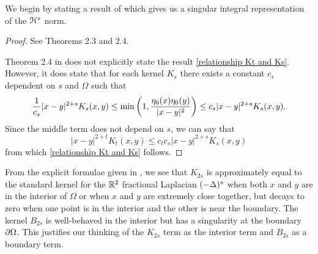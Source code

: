 We begin by stating a result of \cite{CaSt} which gives us a singular integral representation of the $\mathcal{H}^s$ norm.  

\begin{proof}
See \cite{CaSt} Theorems 2.3 and 2.4.  

Theorem 2.4 in \cite{CaSt} does not explicitly state the result \eqref{relationship Kt and Ks}.  However, it does state that for each kernel $K_s$ there exists a constant $c_s$ dependent on $s$ and $\Omega$ such that 
\[ \frac{1}{c_s} |x-y|^{2+s} K_s(x,y) \leq \min\left( 1,\frac{\eta_{0}(x)\eta_{0}(y)}{|x-y|^2} \right) \leq c_s |x-y|^{2+s} K_s(x,y). \]
Since the middle term does not depend on $s$, we can say that
\[ |x-y|^{2+t} K_t(x,y) \leq c_t c_s |x-y|^{2+s} K_s(x,y) \]
from which \eqref{relationship Kt and Ks} follows.  
\end{proof}

From the explicit formulae given in \cite{CaSt}, we see that $K_{2s}$ is approximately equal to the standard kernel for the $\mathbb{R}^2$ fractional Laplacian $(-\Delta)^s$ when both $x$ and $y$ are in the interior of $\Omega$ or when $x$ and $y$ are extremely close together, but decays to zero when one point is in the interior and the other is near the boundary.  The kernel $B_{2s}$ is well-behaved in the interior but has a singularity at the boundary $\partial \Omega$.  This justifies our thinking of the $K_{2s}$ term as the interior term and $B_{2s}$ as a boundary term.  


